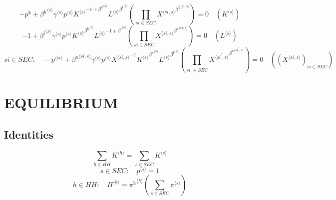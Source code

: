 \begin{equation}
-p^{\mathrm{k}} + {{\beta^{\mathrm{k}}}^{\langle s\rangle}} {{\gamma}^{\langle s\rangle}} {{p}^{\langle s\rangle}} {{{K}^{\langle s\rangle}}^{-1 + {\beta^{\mathrm{k}}}^{\langle s\rangle}}} {{{L}^{\langle s\rangle}}^{{\beta^{\mathrm{l}}}^{\langle s\rangle}}} \left(\prod_{{s\!i}\in {S\!E\!C}} {{X}^{\langle {s\!i},s\rangle}}^{{\beta^{\mathrm{x}}}^{\langle {s\!i},s\rangle}}\right) = 0
 \quad \left({K}^{\langle s\rangle}\right)
\end{equation}
\begin{equation}
-1 + {{\beta^{\mathrm{l}}}^{\langle s\rangle}} {{\gamma}^{\langle s\rangle}} {{p}^{\langle s\rangle}} {{{K}^{\langle s\rangle}}^{{\beta^{\mathrm{k}}}^{\langle s\rangle}}} {{{L}^{\langle s\rangle}}^{-1 + {\beta^{\mathrm{l}}}^{\langle s\rangle}}} \left(\prod_{{s\!i}\in {S\!E\!C}} {{X}^{\langle {s\!i},s\rangle}}^{{\beta^{\mathrm{x}}}^{\langle {s\!i},s\rangle}}\right) = 0
 \quad \left({L}^{\langle s\rangle}\right)
\end{equation}
\begin{equation}
{s\!i}\in {S\!E\!C}\colon\quad -{p}^{\langle {s\!i}\rangle} + {{\beta^{\mathrm{x}}}^{\langle {s\!i},s\rangle}} {{\gamma}^{\langle s\rangle}} {{p}^{\langle s\rangle}} {{X}^{\langle {s\!i},s\rangle}}^{-1} {{{K}^{\langle s\rangle}}^{{\beta^{\mathrm{k}}}^{\langle s\rangle}}} {{{L}^{\langle s\rangle}}^{{\beta^{\mathrm{l}}}^{\langle s\rangle}}} \left(\prod_{{s\!i}^{\prime}\in {S\!E\!C}} {{X}^{\langle {s\!i}^{\prime},s\rangle}}^{{\beta^{\mathrm{x}}}^{\langle {s\!i}^{\prime},s\rangle}}\right) = 0
 \quad \left(\left({X}^{\langle {s\!i},s\rangle}\right)_{{s\!i}\in {S\!E\!C}}\right)
\end{equation}




\section{EQUILIBRIUM}

\subsection{Identities}

\begin{equation}
\sum_{h\in {H\!H}} {K}^{\langle h\rangle} = \sum_{s\in {S\!E\!C}} {K}^{\langle s\rangle}
\end{equation}
\begin{equation}
s\in {S\!E\!C}\colon\quad {p}^{\langle s\rangle} = 1
\end{equation}
\begin{equation}
h\in {H\!H}\colon\quad {\Pi}^{\langle h\rangle} = {{\pi^{\mathrm{h}}}^{\langle h\rangle}} \left(\sum_{s\in {S\!E\!C}} {\pi}^{\langle s\rangle}\right)
\end{equation}





